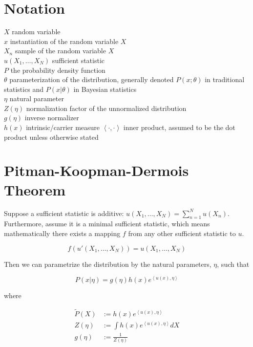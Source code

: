 \documentclass[a4paper]{article}
\begin{document}
\section{Notation}


$X$ random variable \\ 
$x$ instantiation of the random variable $X$ \\
$X_n$ sample of the random variable $X$ \\
$u(X_1, \ldots, X_N)$ sufficient statistic \\
$P$ the probability density function \\
$\theta$ parameterization of the distribution, generally denoted $P(x; \theta)$ in traditional statistics and $P(x \vert \theta)$ in Bayesian statistics \\
$\eta$ natural parameter \\
$Z(\eta)$ normalization factor of the unnormalized distribution\\
$g(\eta)$ inverse normalizer \\
$h(x)$ intrinsic/carrier measure
$ \left< \cdot, \cdot \right>$ inner product, assumed to be the dot product unless otherwise stated

\section{Pitman-Koopman-Dermois Theorem}

Suppose a sufficient statistic is additive: $ u(X_1,\ldots,X_N) = \sum_{n=1}^N u(X_n) $.  Furthermore, assume it is a minimal sufficient statistic, which means mathematically there exists a mapping $f$ from any other sufficient statistic to $u$.

\begin{equation}
  f( u'(X_1,\ldots,X_N) ) = u(X_1,\ldots,X_N)
  \label{}
\end{equation}

Then we can parametrize the distribution by the natural parameters, $\eta$, such that

\begin{equation}
  P( x \vert \eta) = g(\eta) h(x) e^{ \left< u(x), \eta \right>}
  \label{}
\end{equation} 

where 

\begin{equation}
  \begin{split}
    \tilde{P}(X) &:= h(x) e^{ \left< u(x), \eta \right> } \\
    Z(\eta) &:= \int h(x) e^{ \left< u(x), \eta \right> } dX \\
    g(\eta) &:= \frac{1}{Z(\eta)}
  \end{split}
  \label{}
\end{equation}
\end{document}
